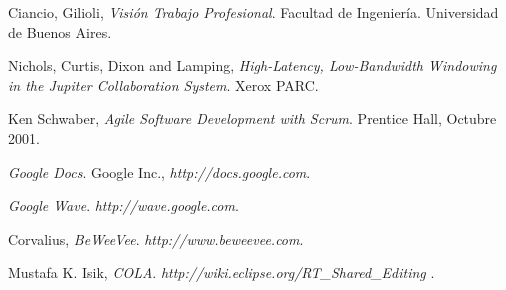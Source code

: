 \documentclass[12pt,a4paper]{article}
\begin{document}
\newpage
\begin{thebibliography}{9}
	Ciancio, Gilioli,
	\emph{Visión Trabajo Profesional}.
	Facultad de Ingeniería.
	Universidad de Buenos Aires. 

	Nichols, Curtis, Dixon and Lamping,
	\emph{High-Latency, Low-Bandwidth Windowing in the Jupiter Collaboration System}.
	Xerox PARC.

	Ken Schwaber,
	\emph{Agile Software Development with Scrum}.
	Prentice Hall, 
	Octubre 2001.
	
	\emph{Google Docs}. 
	Google Inc., 
	\textsl{http://docs.google.com}.
	
	\emph{Google Wave}. 
	\textsl{http://wave.google.com}.

	Corvalius,
	\emph{BeWeeVee}. 
	\textsl{http://www.beweevee.com}.
	
	Mustafa K. Isik,
	\emph{COLA}. 
	\textsl{ http://wiki.eclipse.org/RT\_Shared\_Editing }.
		
\end{thebibliography}
\end{document}
